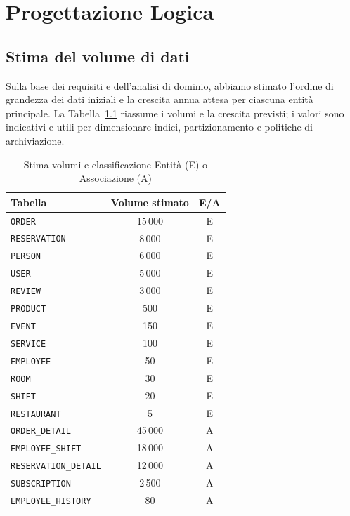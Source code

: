 \documentclass[a4paper,12pt]{report}
\begin{document}
\newpage
\chapter{Progettazione Logica}

\section{Stima del volume di dati}
Sulla base dei requisiti e dell'analisi di dominio, abbiamo stimato l'ordine
di grandezza dei dati iniziali e la crescita annua attesa per ciascuna
entità principale. La Tabella~\ref{tab:volume-dati} riassume i volumi e la
crescita previsti; i valori sono indicativi e utili per dimensionare indici,
partizionamento e politiche di archiviazione.

\begin{table}[H]
  \centering
  \begin{tabularx}{\textwidth}{|X|c|c|}
    \hline
    \rowcolor{gray!15}
    \textbf{Tabella} & \textbf{Volume stimato} & \textbf{E/A} \\
    \hline
    \texttt{ORDER} & 15\,000 & E \\
    \texttt{RESERVATION} & 8\,000 & E \\
    \texttt{PERSON} & 6\,000 & E \\
    \texttt{USER} & 5\,000 & E \\
    \texttt{REVIEW} & 3\,000 & E \\
    \texttt{PRODUCT} & 500 & E \\
    \texttt{EVENT} & 150 & E \\
    \texttt{SERVICE} & 100 & E \\
    \texttt{EMPLOYEE} & 50 & E \\
    \texttt{ROOM} & 30 & E \\
    \texttt{SHIFT} & 20 & E \\
    \texttt{RESTAURANT} & 5 & E \\
    \texttt{ORDER\_DETAIL} & 45\,000  & A \\
    \texttt{EMPLOYEE\_SHIFT} & 18\,000 & A \\
    \texttt{RESERVATION\_DETAIL} & 12\,000 & A \\
    \texttt{SUBSCRIPTION} & 2\,500 & A \\
    \texttt{EMPLOYEE\_HISTORY} & 80 & A \\
    \hline
  \end{tabularx}

  \caption{Stima volumi e classificazione Entità (E) o Associazione (A)}
  \label{tab:volume-dati}
\end{table}
\end{document}
